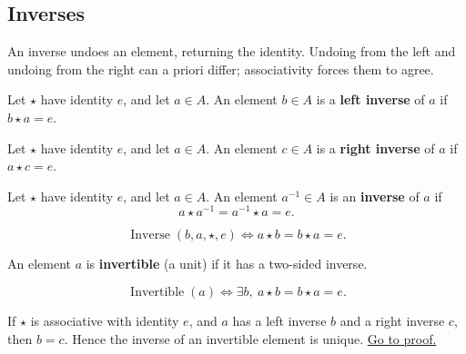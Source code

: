 \subsection{Inverses}
\label{sec:inverses}

\begin{remark*}
An inverse undoes an element, returning the identity. Undoing from the left
and undoing from the right can a priori differ; associativity forces them to
agree.
\end{remark*}

\begin{definition}
\label{def:algebraic-left-inverse}
Let $\star$ have identity $e$, and let $a\in A$. An element $b\in A$ is a
\textbf{left inverse} of $a$ if $b\star a=e$.
\end{definition}

\begin{definition}
\label{def:algebraic-right-inverse}
Let $\star$ have identity $e$, and let $a\in A$. An element $c\in A$ is a
\textbf{right inverse} of $a$ if $a\star c=e$.
\end{definition}

\begin{definition}[Inverse]
\label{def:inverse}
Let $\star$ have identity $e$, and let $a\in A$. An element $a^{-1}\in A$ is
an \textbf{inverse} of $a$ if
\[
  a\star a^{-1}=a^{-1}\star a=e.
\]
\end{definition}

\begin{remark*}
\[
\operatorname{Inverse}(b,a,\star,e)\Longleftrightarrow
a\star b=b\star a=e.
\]
\end{remark*}

\begin{definition}
\label{def:invertible}
An element $a$ is \textbf{invertible} (a unit) if it has a two-sided
inverse.
\end{definition}

\begin{remark*}
\[
\operatorname{Invertible}(a)\Longleftrightarrow
\exists b,\ a\star b=b\star a=e.
\]
\end{remark*}

\begin{proposition}
\label{prop:inverse-collapse}
If $\star$ is associative with identity $e$, and $a$ has a left inverse $b$
and a right inverse $c$, then $b=c$. Hence the inverse of an invertible
element is unique.
\hyperref[prf:inverse-collapse]{Go to proof.}
\end{proposition}

